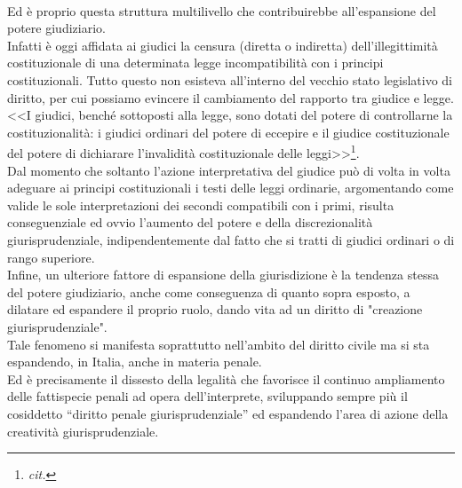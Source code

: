 \\Ed è proprio questa struttura multilivello che contribuirebbe all'espansione del potere giudiziario.
\\Infatti è oggi affidata ai giudici la censura (diretta o indiretta) dell’illegittimità costituzionale di una determinata legge incompatibilità con i principi costituzionali. Tutto questo non esisteva all'interno del vecchio stato legislativo di diritto, per cui possiamo evincere il cambiamento del rapporto tra giudice e legge. 
\\<<I giudici, benché sottoposti alla legge, sono dotati del potere di controllarne la costituzionalità: i giudici ordinari del potere di eccepire e il giudice costituzionale del potere di dichiarare l’invalidità costituzionale delle leggi>>\footnote{\textit{cit.}}. 
\\Dal momento che soltanto l'azione interpretativa del giudice può di volta in volta adeguare ai principi costituzionali i testi delle leggi ordinarie, argomentando come valide le sole interpretazioni dei secondi compatibili con i primi, risulta conseguenziale ed ovvio l'aumento del potere e della discrezionalità giurisprudenziale, indipendentemente dal fatto che si tratti di giudici ordinari o di rango superiore.
\\Infine, un ulteriore fattore di espansione della giurisdizione è la tendenza stessa del potere giudiziario, anche come conseguenza di quanto sopra esposto, a dilatare ed espandere il proprio ruolo, dando vita ad un diritto di "creazione giurisprudenziale". 
\\Tale fenomeno si manifesta soprattutto nell'ambito del diritto civile ma si sta espandendo, in Italia, anche in materia penale. 
\\Ed è precisamente il dissesto della legalità che favorisce il continuo ampliamento delle fattispecie penali ad opera dell'interprete, sviluppando sempre più il cosiddetto “diritto penale giurisprudenziale” ed espandendo l'area di azione della creatività giurisprudenziale.
